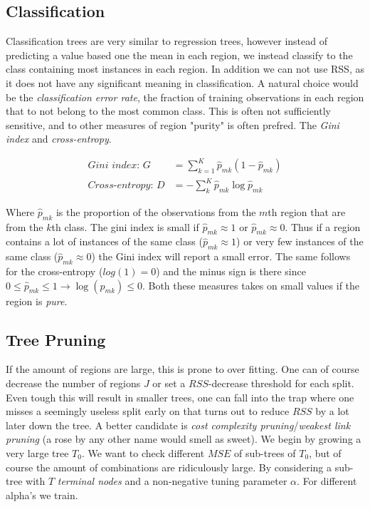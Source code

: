 \documentclass{article}
\begin{document}
\subsection{Classification}
Classification trees are very similar to regression trees, however instead of predicting a value based one the mean in each region, we instead classify to the class containing most instances in each region. In addition we can not use RSS, as it does not have any significant meaning in classification. A natural choice would be the \textit{classification error rate}, the fraction of training observations in each region that to not belong to the most common class. This is often not sufficiently sensitive, and to other measures of region "purity" is often prefred. The \textit{Gini index} and \textit{cross-entropy}.

\begin{align*}
\textit{Gini index: } G &= \sum_{k = 1}^{K} \hat{p}_{mk} (1-\hat{p}_{mk}) \\
\textit{Cross-entropy: } D &= -\sum_{k}^{K} \hat{p}_{mk} \log{\hat{p}_{mk}}
\end{align*}

Where $\hat{p}_{mk}$ is the proportion of the observations from the $m$th region that are from the $k$th class. The gini index is small if $\hat{p}_{mk} \approx 1$ or $\hat{p}_{mk} \approx 0$. Thus if a region contains a lot of instances of the same class ($\hat{p}_{mk} \approx 1$) or very few instances of the same class ($\hat{p}_{mk} \approx 0$) the Gini index will report a small error. The same follows for the cross-entropy ($log(1) = 0$) and the minus sign is there since $0 \leq \hat{p}_{mk} \leq 1 \rightarrow \log(\hat{p}_{mk}) \leq 0$. Both these measures takes on small values if the region is \textit{pure}.  

\subsection{Tree Pruning}
If the amount of regions are large, this is prone to over fitting. One can of course decrease the number of regions $J$ or set a $RSS$-decrease threshold for each split. Even tough this will result in smaller trees, one can fall into the trap where one misses a seemingly useless split early on that turns out to reduce $RSS$ by a lot later down the tree. A better candidate is \textit{cost complexity pruning}/\textit{weakest link pruning} (a rose by any other name would smell as sweet). We begin by growing a very large tree $T_0$. We want to check different $MSE$ of sub-trees of $T_0$, but of course the amount of combinations are ridiculously large. By considering a sub-tree with $T$ \textit{terminal nodes} and a non-negative tuning parameter $\alpha$. For different alpha's we train.
\end{document}
